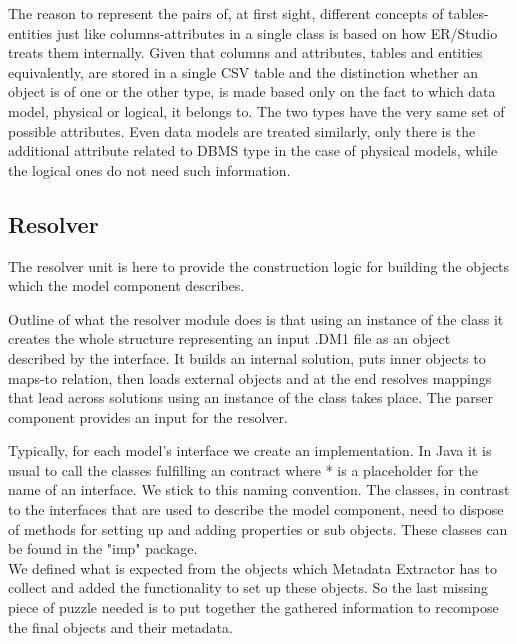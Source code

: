The reason to represent the pairs of, at first sight, different concepts of tables-entities just like columns-attributes in a single class is based on how ER/Studio treats them internally. Given that columns and attributes, tables and entities equivalently, are stored in a single CSV table and the distinction whether an object is of one or the other type, is made based only on the fact to which data model, physical or logical, it belongs to.
The two types have the very same set of possible attributes. 
Even data models are treated similarly, only there is the additional attribute related to DBMS type in the case of physical models, while the logical ones do not need such information.

\subsection{Resolver}

The resolver unit is here to provide the construction logic for building the objects which the model component describes.

Outline of what the resolver module does is that using an instance of the  class it creates the whole structure representing an input .DM1 file as an object described by the  interface. 
It builds an internal solution, puts inner objects to maps-to relation, then loads external objects and at the end resolves mappings that lead across solutions using an instance of the  class takes place.
The parser component provides an input for the resolver.

Typically, for each model's interface we create an implementation. 
In Java it is usual to call the classes fulfilling an contract  where * is a placeholder for the name of an interface. We stick to this naming convention. 
The  classes, in contrast to the interfaces that are used to describe the model component, need to dispose of methods for setting up and adding properties or sub objects. These classes can be found in the "imp" package. \\

We defined what is expected from the objects which Metadata Extractor has to collect and added the functionality to set up these objects.
So the last missing piece of puzzle needed is to put together the gathered information to recompose the final objects and their metadata.

